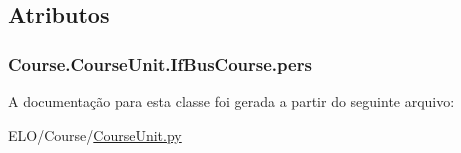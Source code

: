 \subsection{Atributos}
\hypertarget{classCourse_1_1CourseUnit_1_1IfBusCourse_ab926ae8fb127b7697e2b63025df09a78}{
\subsubsection[{pers}]{\setlength{\rightskip}{0pt plus 5cm}Course.\-Course\-Unit.\-If\-Bus\-Course.\-pers}}\label{d0/d28/classCourse_1_1CourseUnit_1_1IfBusCourse_ab926ae8fb127b7697e2b63025df09a78}


A documentação para esta classe foi gerada a partir do seguinte arquivo\-:\begin{DoxyCompactItemize}
\item 
E\-L\-O/\-Course/\hyperlink{CourseUnit_8py}{Course\-Unit.\-py}\end{DoxyCompactItemize}
